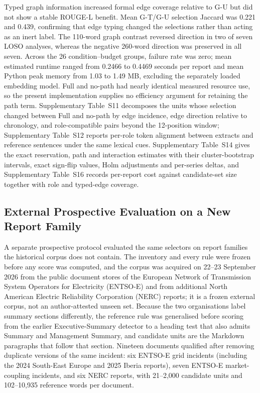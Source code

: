 \documentclass[information,article,submit,moreauthors]{Definitions/mdpi}
\begin{document}
Typed graph information increased formal edge coverage relative to G-U but did not show a stable ROUGE-L benefit. Mean G-T/G-U selection Jaccard was 0.221 and 0.439, confirming that edge typing changed the selections rather than acting as an inert label. The 110-word graph contrast reversed direction in two of seven LOSO analyses, whereas the negative 260-word direction was preserved in all seven. Across the 26 condition--budget groups, failure rate was zero; mean estimated runtime ranged from 0.2466 to 0.4469 seconds per report and mean Python peak memory from 1.03 to 1.49 MB, excluding the separately loaded embedding model. Full and no-path had nearly identical measured resource use, so the present implementation supplies no efficiency argument for retaining the path term. Supplementary Table~S11 decomposes the units whose selection changed between Full and no-path by edge incidence, edge direction relative to chronology, and role-compatible pairs beyond the 12-position window; Supplementary Table~S12 reports per-role token alignment between extracts and reference sentences under the same lexical cues. Supplementary Table~S14 gives the exact reservation, path and interaction estimates with their cluster-bootstrap intervals, exact sign-flip values, Holm adjustments and per-series deltas, and Supplementary Table~S16 records per-report cost against candidate-set size together with role and typed-edge coverage.

\subsection{External Prospective Evaluation on a New Report Family}
\label{sec:external-prospective}

A separate prospective protocol evaluated the same selectors on report families the historical corpus does not contain. The inventory and every rule were frozen before any score was computed, and the corpus was acquired on 22--23 September 2026 from the public document stores of the European Network of Transmission System Operators for Electricity (ENTSO-E) and from additional North American Electric Reliability Corporation (NERC) reports; it is a frozen external corpus, not an author-attested unseen set. Because the two organisations label summary sections differently, the reference rule was generalised before scoring from the earlier Executive-Summary detector to a heading test that also admits Summary and Management Summary, and candidate units are the Markdown paragraphs that follow that section. Nineteen documents qualified after removing duplicate versions of the same incident: six ENTSO-E grid incidents (including the 2024 South-East Europe and 2025 Iberia reports), seven ENTSO-E market-coupling incidents, and six NERC reports, with 21--2,000 candidate units and 102--10,935 reference words per document.
\end{document}
